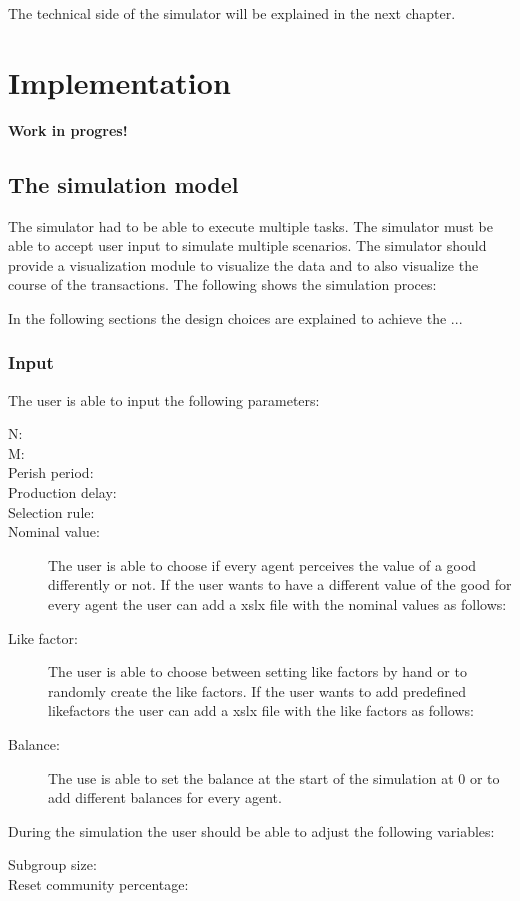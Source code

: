 \documentclass[twoside,openright]{uva-bachelor-thesis}
\begin{document}
The technical side of the simulator will be explained in the next chapter. 


\chapter{Implementation}
\textbf{Work in progres!}
\section{The simulation model}
The simulator had to be able to execute multiple tasks. The simulator must be able to accept user input to simulate multiple scenarios. The simulator should provide a visualization module to visualize the data and to also visualize the course of the transactions. The following shows the simulation proces:

In the following sections the design choices are explained to achieve the ...
\subsection{Input}
The user is able to input the following parameters:

\begin{description}
  \item[N:] 
  \item[M:] 
  \item[Perish period:] 
  \item[Production delay:]
 \item[Selection rule:] 
  \item[Nominal value:] The user is able to choose if every agent perceives the value of a good differently or not. If the user wants to have a different value of the good for every agent the user can add a xslx file with the nominal values as follows:
  \item[Like factor:] The user is able to choose between setting like factors by hand or to randomly create the like factors. If the user wants to add predefined likefactors the user can add a xslx file with the like factors as follows:
 \item[Balance:] The use is able to set the balance at the start of the simulation at 0 or to add different balances for every agent.
\end{description}
During the simulation the user should be able to adjust the following variables:

\begin{description}
  \item[Subgroup size:] 
  \item[Reset community percentage:] 

\end{description}
\end{document}
